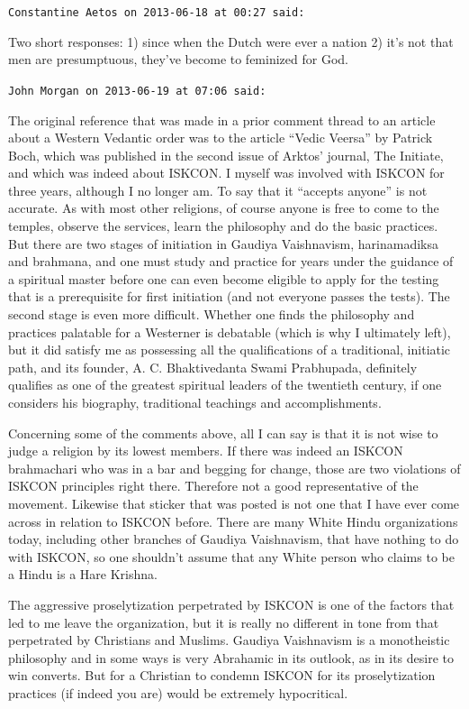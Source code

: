 \begin{footnotesize}
\begin{sffamily}
\hfill

\texttt{Constantine Aetos on 2013-06-18 at 00:27 said:}

Two short responses: 1) since when the Dutch were ever a nation 2) it's not that men are presumptuous, they've become to feminized for God.

\hfill

\texttt{John Morgan on 2013-06-19 at 07:06 said:}

The original reference that was made in a prior comment thread to an article about a Western Vedantic order was to the article ``Vedic Veersa'' by Patrick Boch, which was published in the second issue of Arktos' journal, The Initiate, and which was indeed about ISKCON. I myself was involved with ISKCON for three years, although I no longer am. To say that it ``accepts anyone'' is not accurate. As with most other religions, of course anyone is free to come to the temples, observe the services, learn the philosophy and do the basic practices. But there are two stages of initiation in Gaudiya Vaishnavism, harinamadiksa and brahmana, and one must study and practice for years under the guidance of a spiritual master before one can even become eligible to apply for the testing that is a prerequisite for first initiation (and not everyone passes the tests). The second stage is even more difficult. Whether one finds the philosophy and practices palatable for a Westerner is debatable (which is why I ultimately left), but it did satisfy me as possessing all the qualifications of a traditional, initiatic path, and its founder, A. C. Bhaktivedanta Swami Prabhupada, definitely qualifies as one of the greatest spiritual leaders of the twentieth century, if one considers his biography, traditional teachings and accomplishments.

Concerning some of the comments above, all I can say is that it is not wise to judge a religion by its lowest members. If there was indeed an ISKCON brahmachari who was in a bar and begging for change, those are two violations of ISKCON principles right there. Therefore not a good representative of the movement. Likewise that sticker that was posted is not one that I have ever come across in relation to ISKCON before. There are many White Hindu organizations today, including other branches of Gaudiya Vaishnavism, that have nothing to do with ISKCON, so one shouldn't assume that any White person who claims to be a Hindu is a Hare Krishna.

The aggressive proselytization perpetrated by ISKCON is one of the factors that led to me leave the organization, but it is really no different in tone from that perpetrated by Christians and Muslims. Gaudiya Vaishnavism is a monotheistic philosophy and in some ways is very Abrahamic in its outlook, as in its desire to win converts. But for a Christian to condemn ISKCON for its proselytization practices (if indeed you are) would be extremely hypocritical.


\end{sffamily}
\end{footnotesize}
